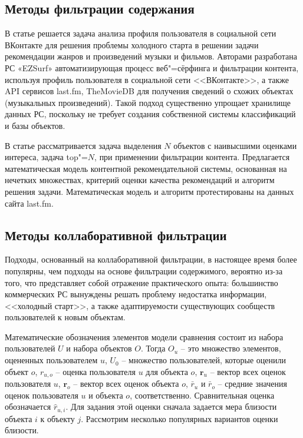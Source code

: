 \documentclass[a4paper,14pt,openany,final]{extreport} %
\begin{document}
\subsection{Методы фильтрации содержания}
\label{sec:content-filtering}

В статье \cite{b5} решается задача анализа профиля пользователя в социальной сети ВКонтакте для решения проблемы холодного старта в решении задачи рекомендации жанров и произведений музыки и фильмов. Авторами разработана РС «EZSurf» автоматизирующая процесс веб"=сёрфинга и фильтрации контента, используя профиль пользователя в социальной сети <<ВКонтакте>>, а также API сервисов last.fm, TheMovieDB для получения сведений о схожих объектах (музыкальных произведений). Такой подход существенно упрощает хранилище данных РС, поскольку не требует создания собственной системы классификаций и базы объектов.

В статье \cite{b9} рассматривается задача выделения $N$ объектов с наивысшими оценками интереса, задача top"=$N$, при применении фильтрации контента. Предлагается математическая модель контентной рекомендательной системы, основанная на нечетких множествах, критерий оценки качества рекомендаций и алгоритм решения задачи. Математическая модель и алгоритм протестированы на данных сайта last.fm.

\subsection{Методы коллаборативной фильтрации}
\label{sec:collab-filtering}

Подходы, основанный на коллаборативной фильтрации, в настоящее время более популярны, чем подходы на основе фильтрации содержимого, вероятно из-за того, что представляет собой отражение практического опыта: большинство коммерческих РС вынуждены решать проблему недостатка информации, <<холодный старт>>, а также адаптируемости существующих сообществ пользователей к новым объектам.

Математические обозначения элементов модели сравнения состоит из набора пользователей $U$  и набора объектов $O$. Тогда $O_u$ -- это множество элементов, оцененных пользователем $u$, $U_0$ -- множество пользователей, которые оценили объект $o$, $r_{u,o}$ -- оценка пользователя $u$ для объекта $o$, $\mathbf{r}_u$ -- вектор всех оценок пользователя $u$, $\mathbf{r}_o$  -- вектор всех оценок объекта $o$, $\bar{r}_u$ и $\bar{r}_o$ -- средние значения оценок пользователя $u$ и объекта $o$,   соответственно. Сравнительная оценка обозначается $\hat{r}_{u,i}$. Для задания этой оценки сначала задается мера близости объекта $i$ к объекту $j$. Рассмотрим несколько популярных вариантов оценки близости.
\end{document}
